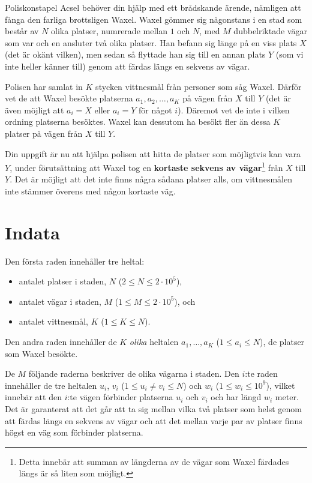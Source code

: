\noindent
Poliskonstapel Acsel behöver din hjälp med ett brådskande ärende, nämligen att fånga den farliga brottsligen Waxel.
Waxel gömmer sig någonstans i en stad som består av $N$ olika platser, numrerade mellan $1$ och $N$, med $M$ dubbelriktade vägar som var och en ansluter två olika platser.
Han befann sig länge på en viss plats $X$ (det är okänt vilken), men sedan så flyttade han sig till en annan plats $Y$ (som vi inte heller känner till) genom att färdas längs en sekvens av vägar.

Polisen har samlat in $K$ stycken vittnesmål från personer som såg Waxel.
Därför vet de att Waxel besökte platserna $a_1, a_2, \dots, a_K$ på vägen från $X$ till $Y$ (det är även möjligt att $a_i = X$ eller $a_i = Y$ för något $i$).
Däremot vet de inte i vilken ordning platserna besöktes.
Waxel kan dessutom ha besökt fler än dessa $K$ platser på vägen från $X$ till $Y$.

Din uppgift är nu att hjälpa polisen att hitta de platser som möjligtvis kan vara $Y$, under förutsättning att Waxel tog en \textbf{kortaste sekvens av vägar}\footnote{Detta innebär att summan av längderna av de vägar som Waxel färdades längs är så liten som möjligt.} från $X$ till $Y$.
Det är möjligt att det inte finns några sådana platser alls, om vittnesmålen inte stämmer överens med någon kortaste väg.

\section*{Indata}
Den första raden innehåller tre heltal:
\begin{itemize}
\item antalet platser i staden, $N$ ($2 \leq N \leq 2\cdot 10^5$),
\item antalet vägar i staden, $M$ ($1 \leq M \leq 2 \cdot 10^5$), och
\item antalet vittnesmål, $K$ ($1 \leq K \leq N$).
\end{itemize}

Den andra raden innehåller de $K$ \emph{olika} heltalen $a_1, \dots, a_K$ ($1 \leq a_i \leq N$), de platser som Waxel besökte.

De $M$ följande raderna beskriver de olika vägarna i staden.
Den $i$:te raden innehåller de tre heltalen $u_i$, $v_i$ ($1 \leq u_i \not= v_i \le N$) och $w_i$ ($1 \leq w_i \leq 10^9$), vilket innebär att den $i$:te vägen förbinder platserna $u_i$ och $v_i$ och har längd $w_i$ meter.
Det är garanterat att det går att ta sig mellan vilka två platser som helst genom att färdas längs en sekvens av vägar och att det mellan varje par av platser finns högst en väg som förbinder platserna.

